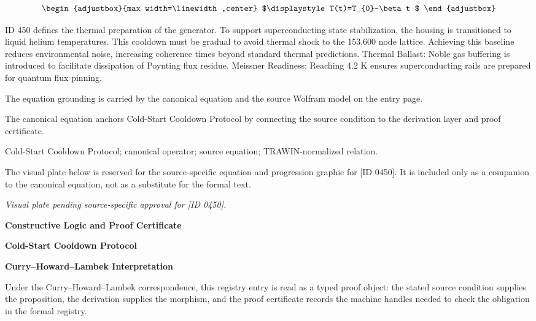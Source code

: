 \[
\begin{adjustbox}{max width=\linewidth,center}
$\displaystyle
T(t)=T_{0}-\beta t
$
\end{adjustbox}
\]

ID 450 defines the thermal preparation of the generator. To support superconducting state stabilization, the housing is transitioned to liquid helium temperatures. This cooldown must be gradual to avoid thermal shock to the 153,600 node lattice. Achieving this baseline reduces environmental noise, increasing coherence times beyond standard thermal predictions. Thermal Ballast: Noble gas buffering is introduced to facilitate dissipation of Poynting flux residue. Meissner Readiness: Reaching 4.2 K ensures superconducting rails are prepared for quantum flux pinning.

The equation grounding is carried by the canonical equation and the source Wolfram model on the entry page.

The canonical equation anchors Cold-Start Cooldown Protocol by connecting the source condition to the derivation layer and proof certificate.

Cold-Start Cooldown Protocol; canonical operator; source equation; TRAWIN-normalized relation.
\endgroup

\begingroup\footnotesize\sloppy
The visual plate below is reserved for the source-specific equation and progression graphic for [ID 0450]. It is included only as a companion to the canonical equation, not as a substitute for the formal text.
\par\endgroup
\begingroup\footnotesize\itshape
Visual plate pending source-specific approval for [ID 0450].
\par\endgroup

\clearpage
\begingroup\tzpsupportsetup
\noindent\textbf{\fontsize{10.8pt}{12.8pt}\selectfont [ID 0450] Constructive Logic and Proof Certificate}\par
\noindent\textbf{\fontsize{10pt}{12pt}\selectfont Cold-Start Cooldown Protocol}\par
\vspace{0.45em}
\begingroup
\footnotesize
\setlength{\parskip}{0.22em}
\setlength{\parindent}{0pt}
\noindent\textbf{Curry--Howard--Lambek Interpretation}\par
Under the Curry--Howard--Lambek correspondence, this registry entry is read as a typed proof
object: the stated source condition supplies the proposition, the derivation supplies the
morphism, and the proof certificate records the machine handles needed to check the obligation
in the formal registry.

